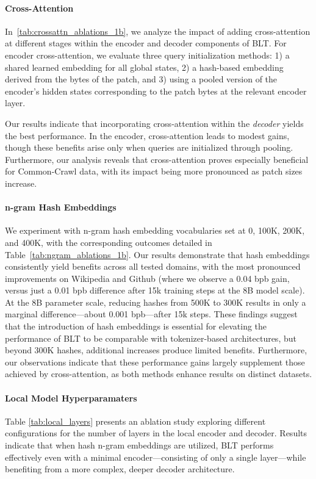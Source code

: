 \paragraph{Cross-Attention} 
In~\autoref{tab:crossattn_ablations_1b}, we analyze the impact of adding cross-attention at different stages within the encoder and decoder components of {\textsc BLT}. For encoder cross-attention, we evaluate three query initialization methods: 1) a shared learned embedding for all global states, 2) a hash-based embedding derived from the bytes of the patch, and 3) using a pooled version of the encoder’s hidden states corresponding to the patch bytes at the relevant encoder layer.

Our results indicate that incorporating cross-attention within the \textit{decoder} yields the best performance. In the encoder, cross-attention leads to modest gains, though these benefits arise only when queries are initialized through pooling. Furthermore, our analysis reveals that cross-attention proves especially beneficial for Common-Crawl data, with its impact being more pronounced as patch sizes increase.

\paragraph{n-gram Hash Embeddings} 

We experiment with n-gram hash embedding vocabularies set at 0, 100K, 200K, and 400K, with the corresponding outcomes detailed in Table~\ref{tab:ngram_ablations_1b}. Our results demonstrate that hash embeddings consistently yield benefits across all tested domains, with the most pronounced improvements on Wikipedia and Github (where we observe a 0.04 bpb gain, versus just a 0.01 bpb difference after 15k training steps at the 8B model scale). At the 8B parameter scale, reducing hashes from 500K to 300K results in only a marginal difference—about 0.001 bpb—after 15k steps. These findings suggest that the introduction of hash embeddings is essential for elevating the performance of {\textsc BLT} to be comparable with tokenizer-based architectures, but beyond 300K hashes, additional increases produce limited benefits. Furthermore, our observations indicate that these performance gains largely supplement those achieved by cross-attention, as both methods enhance results on distinct datasets.

\paragraph{Local Model Hyperparamaters} Table \ref{tab:local_layers} presents an ablation study exploring different configurations for the number of layers in the local encoder and decoder. Results indicate that when hash n-gram embeddings are utilized, {\textsc BLT} performs effectively even with a minimal encoder—consisting of only a single layer—while benefiting from a more complex, deeper decoder architecture.

